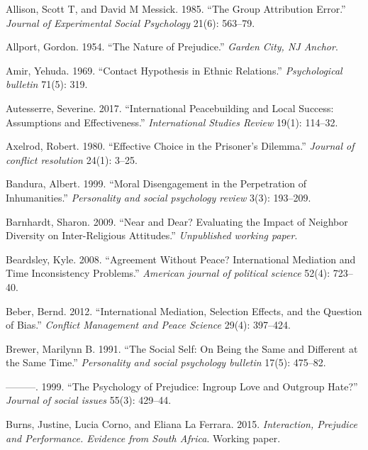 \documentclass[11pt]{article}
\begin{document}
\hypertarget{refs}{}
\leavevmode\hypertarget{ref-allison1985group}{}%
Allison, Scott T, and David M Messick. 1985. ``The Group Attribution
Error.'' \emph{Journal of Experimental Social Psychology} 21(6):
563--79.

\leavevmode\hypertarget{ref-allport1954prejudice}{}%
Allport, Gordon. 1954. ``The Nature of Prejudice.'' \emph{Garden City,
NJ Anchor}.

\leavevmode\hypertarget{ref-amir1969contact}{}%
Amir, Yehuda. 1969. ``Contact Hypothesis in Ethnic Relations.''
\emph{Psychological bulletin} 71(5): 319.

\leavevmode\hypertarget{ref-autesserre2017international}{}%
Autesserre, Severine. 2017. ``International Peacebuilding and Local
Success: Assumptions and Effectiveness.'' \emph{International Studies
Review} 19(1): 114--32.

\leavevmode\hypertarget{ref-axelrod1980effective}{}%
Axelrod, Robert. 1980. ``Effective Choice in the Prisoner's Dilemma.''
\emph{Journal of conflict resolution} 24(1): 3--25.

\leavevmode\hypertarget{ref-bandura1999moral}{}%
Bandura, Albert. 1999. ``Moral Disengagement in the Perpetration of
Inhumanities.'' \emph{Personality and social psychology review} 3(3):
193--209.

\leavevmode\hypertarget{ref-barnhardt2009near}{}%
Barnhardt, Sharon. 2009. ``Near and Dear? Evaluating the Impact of
Neighbor Diversity on Inter-Religious Attitudes.'' \emph{Unpublished
working paper}.

\leavevmode\hypertarget{ref-beardsley2008agreement}{}%
Beardsley, Kyle. 2008. ``Agreement Without Peace? International
Mediation and Time Inconsistency Problems.'' \emph{American journal of
political science} 52(4): 723--40.

\leavevmode\hypertarget{ref-beber2012international}{}%
Beber, Bernd. 2012. ``International Mediation, Selection Effects, and
the Question of Bias.'' \emph{Conflict Management and Peace Science}
29(4): 397--424.

\leavevmode\hypertarget{ref-brewer1991social}{}%
Brewer, Marilynn B. 1991. ``The Social Self: On Being the Same and
Different at the Same Time.'' \emph{Personality and social psychology
bulletin} 17(5): 475--82.

\leavevmode\hypertarget{ref-brewer1999ingroupOutgroup}{}%
---------. 1999. ``The Psychology of Prejudice: Ingroup Love and
Outgroup Hate?'' \emph{Journal of social issues} 55(3): 429--44.

\leavevmode\hypertarget{ref-burns2015interaction}{}%
Burns, Justine, Lucia Corno, and Eliana La Ferrara. 2015.
\emph{Interaction, Prejudice and Performance. Evidence from South
Africa}. Working paper.
\end{document}
